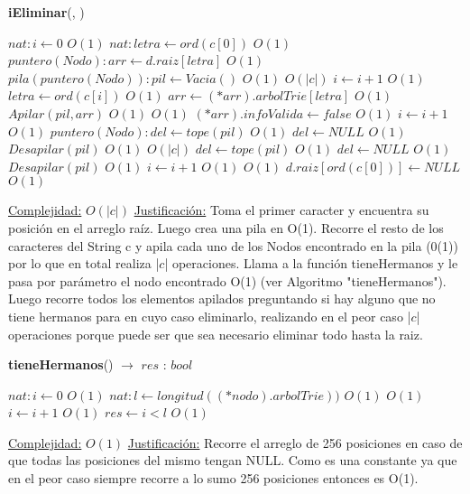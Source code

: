 \begin{algorithm}[H]{\textbf{iEliminar}(, )}
	\begin{algorithmic}
		\State $nat: i \gets 0$ \Comment $O(1)$
		\State $nat: letra \gets ord(c[0])$ \Comment $O(1)$
		\State $puntero(Nodo): arr \gets d.raiz[letra]$ \Comment $O(1)$
		\State $pila(puntero(Nodo)): pil \gets Vacia()$ \Comment $O(1)$
		 \Comment $O(|c|)$
			\State $i \gets i + 1$ \Comment $O(1)$
			\State $letra \gets ord(c[i])$ \Comment $O(1)$
			\State $arr \gets (*arr).arbolTrie[letra]$ \Comment $O(1)$
			\State $Apilar(pil,arr)$ \Comment $O(1)$
		\EndWhile
		 \Comment $O(1)$
			\State $(*arr).infoValida \gets false$ \Comment $O(1)$
		\Else
			\State $i \gets i + 1$ \Comment $O(1)$
			\State $puntero(Nodo): del \gets tope(pil)$ \Comment $O(1)$
			\State $del \gets NULL$ \Comment $O(1)$
			\State $Desapilar(pil)$ \Comment $O(1)$
			 \Comment $O(|c|)$
				\State $del \gets tope(pil)$ \Comment $O(1)$
				\State $del \gets NULL$ \Comment $O(1)$
				\State $Desapilar(pil)$ \Comment $O(1)$
				\State $i \gets i + 1$ \Comment $O(1)$
			\EndWhile
			 \Comment $O(1)$
				\State $d.raiz[ord(c[0])] \gets NULL$ \Comment $O(1)$
			\EndIf
		\EndIf

		\medskip
		\Statex \underline{Complejidad:} $O(|c|)$
		\Statex \underline{Justificación:} Toma el primer caracter y encuentra su posición en el arreglo raíz. Luego crea una pila en O(1). Recorre el resto de los caracteres del String c y apila cada uno de los Nodos encontrado en la pila (0(1)) por lo que en total realiza |$c$| operaciones. Llama a la función tieneHermanos y le pasa por parámetro el nodo encontrado O(1) (ver Algoritmo "tieneHermanos"). Luego recorre todos los elementos apilados preguntando si hay alguno que no tiene hermanos para en cuyo caso eliminarlo, realizando en el peor caso |$c$| operaciones porque puede ser que sea necesario eliminar todo hasta la raiz.

    \end{algorithmic}
\end{algorithm}


\begin{algorithm}[H]{\textbf{tieneHermanos}() $\to$ $res$ : $bool$}
	\begin{algorithmic}
		\State $nat: i \gets 0$ \Comment $O(1)$
		\State $nat: l \gets longitud((*nodo).arbolTrie))$ \Comment $O(1)$
		 \Comment $O(1)$
			\State $i \gets i + 1$ \Comment $O(1)$
		\EndWhile
		\State $res \gets i < l$ \Comment $O(1)$

		\medskip
		\Statex \underline{Complejidad:} $O(1)$
		\Statex \underline{Justificación:} Recorre el arreglo de 256 posiciones en caso de que todas las posiciones del mismo tengan NULL. Como es una constante ya que en el peor caso siempre recorre a lo sumo 256 posiciones entonces es O(1).

    \end{algorithmic}
\end{algorithm}


